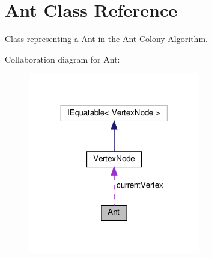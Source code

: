 \hypertarget{classAnt}{}\section{Ant Class Reference}
\label{classAnt}


Class representing a \hyperlink{classAnt}{Ant} in the \hyperlink{classAnt}{Ant} Colony Algorithm.  




Collaboration diagram for Ant\+:\nopagebreak
\begin{figure}[H]
\begin{center}
\leavevmode
\includegraphics[width=213pt]{classAnt__coll__graph}
\end{center}
\end{figure}

